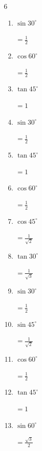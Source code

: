\begin{multicols}{6}
\begin{enumerate}
  \item $\displaystyle \sin{30^\circ}$

        $\displaystyle =\frac{1}{2}$

  \item $\displaystyle \cos{60^\circ}$

        $\displaystyle =\frac{1}{2}$

  \item $\displaystyle \tan{45^\circ}$

        $\displaystyle =1$

  \item $\displaystyle \sin{30^\circ}$

        $\displaystyle =\frac{1}{2}$

  \item $\displaystyle \tan{45^\circ}$

        $\displaystyle =1$

\columnbreak %

  \item $\displaystyle \cos{60^\circ}$

        $\displaystyle =\frac{1}{2}$

  \item $\displaystyle \cos{45^\circ}$

        $\displaystyle =\frac{1}{\sqrt{2}}$

  \item $\displaystyle \tan{30^\circ}$

        $\displaystyle =\frac{1}{\sqrt{3}}$

  \item $\displaystyle \sin{30^\circ}$

        $\displaystyle =\frac{1}{2}$

  \item $\displaystyle \sin{45^\circ}$

        $\displaystyle =\frac{1}{\sqrt{2}}$

  \item $\displaystyle \cos{60^\circ}$

        $\displaystyle =\frac{1}{2}$

  \item $\displaystyle \tan{45^\circ}$

        $\displaystyle =1$

  \item $\displaystyle \sin{60^\circ}$

        $\displaystyle =\frac{\sqrt{3}}{2}$


\end{enumerate}
\end{multicols}
